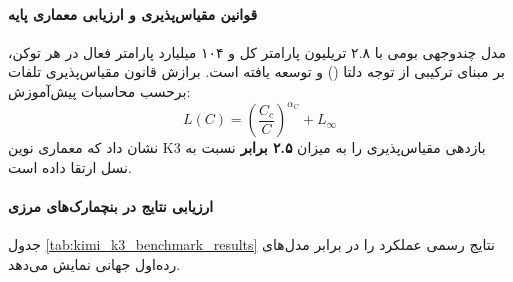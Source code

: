 \item {}

\paragraph*{قوانین مقیاس‌پذیری و ارزیابی معماری پایه}
مدل چندوجهی بومی  \cite{kimik3team2026} با ۲.۸ تریلیون پارامتر کل و ۱۰۴ میلیارد پارامتر فعال در هر توکن، بر مبنای ترکیبی از توجه دلتا () و  توسعه یافته است. برازش قانون مقیاس‌پذیری تلفات برحسب محاسبات پیش‌آموزش:
\begin{equation}
    L(C) = \left(\frac{C_c}{C}\right)^{\alpha_C} + L_\infty
\end{equation}
نشان داد که معماری نوین K3 بازدهی مقیاس‌پذیری را به میزان \textbf{۲.۵ برابر} نسبت به نسل  ارتقا داده است. 

\paragraph*{ارزیابی نتایج در بنچمارک‌های مرزی}
جدول \ref{tab:kimi_k3_benchmark_results} نتایج رسمی عملکرد  را در برابر مدل‌های رده‌اول جهانی نمایش می‌دهد.

